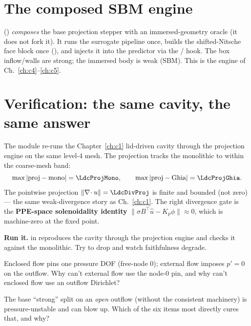 \section{The composed SBM engine}
 () \emph{composes} the
base projection stepper with an immersed-geometry oracle (it does not fork
it). It runs the surrogate pipeline once, builds the shifted-Nitsche face
block once (), and injects it into the predictor
via the / hook. The box inflow/walls are
strong; the immersed body is weak (SBM). This is the engine of
Ch.~\ref{ch:c4}--\ref{ch:c5}.

\section{Verification: the same cavity, the same answer}
The module re-runs the Chapter~\ref{ch:c1} lid-driven cavity through the
projection engine on the same level-4 mesh. The projection tracks the
monolithic to within the coarse-mesh band:
\[
\max|\text{proj}-\text{mono}| = \LdcProjMono,\qquad
\max|\text{proj}-\text{Ghia}| = \LdcProjGhia.
\]
The pointwise projection $\|\grad\!\cdot u\| = \LdcDivProj$ is finite and
bounded (not zero) --- the same weak-divergence story as
Ch.~\ref{ch:c1}. The right divergence gate is the \textbf{PPE-space
solenoidality identity} $\|\sigma B^\top\hat u - K_p\phi\|\approx0$, which
is machine-zero at the fixed point.

\begin{runbox}\textbf{Run it.}  in
 reproduces the cavity through the
projection engine and checks it against the monolithic. Try
 to drop  and watch
faithfulness degrade.\end{runbox}

\question Enclosed flow pins one pressure DOF (free-node 0); external flow
imposes $p'=0$ on the outflow. Why can't external flow use the node-0 pin,
and why can't enclosed flow use an outflow Dirichlet?

\question The base ``strong'' split on an \emph{open} outflow (without the
consistent machinery) is pressure-unstable and can blow up. Which of the
six  items most directly cures that, and why?
